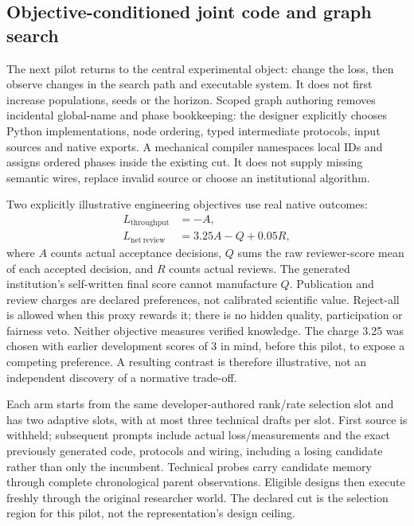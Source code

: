 \subsection{Objective-conditioned joint code and graph search}

The next pilot returns to the central experimental object: change the loss,
then observe changes in the search path and executable system. It does not
first increase populations, seeds or the horizon. Scoped graph authoring
removes incidental global-name and phase bookkeeping: the designer explicitly
chooses Python implementations, node ordering, typed intermediate protocols,
input sources and native exports. A mechanical compiler namespaces local IDs
and assigns ordered phases inside the existing cut. It does not supply missing
semantic wires, replace invalid source or choose an institutional algorithm.

Two explicitly illustrative engineering objectives use real native outcomes:
\begin{align}
 L_{\mathrm{throughput}} &= -A,\\
 L_{\mathrm{net\ review}} &= 3.25A-Q+0.05R,
\end{align}
where $A$ counts actual acceptance decisions, $Q$ sums the raw reviewer-score
mean of each accepted decision, and $R$ counts actual reviews. The generated
institution's self-written final score cannot manufacture $Q$. Publication
and review charges are declared preferences, not calibrated scientific value.
Reject-all is allowed when this proxy rewards it; there is no hidden quality,
participation or fairness veto. Neither objective measures verified knowledge.
The charge 3.25 was chosen with earlier development scores of 3 in mind, before
this pilot, to expose a competing preference. A resulting contrast is therefore
illustrative, not an independent discovery of a normative trade-off.

Each arm starts from the same developer-authored rank/rate selection slot and
has two adaptive slots, with at most three technical drafts per slot. First
source is withheld; subsequent prompts include actual loss/measurements and
the exact previously generated code, protocols and wiring, including a losing
candidate rather than only the incumbent. Technical probes carry candidate
memory through complete chronological parent observations. Eligible designs
then execute freshly through the original researcher world. The declared cut
is the selection region for this pilot, not the representation's design ceiling.

